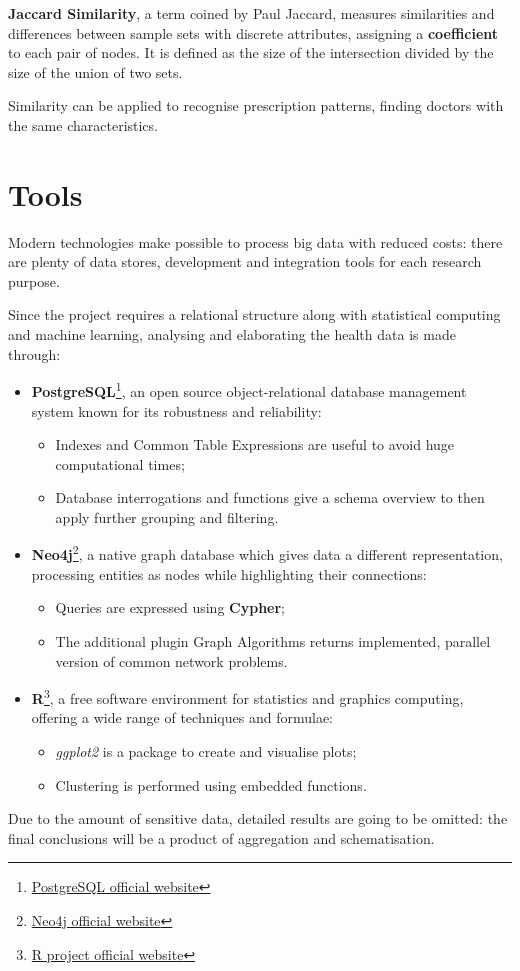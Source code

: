 \textbf{Jaccard Similarity}, a term coined by Paul Jaccard, measures similarities and differences between sample sets with discrete attributes, assigning a \textbf{coefficient} to each pair of nodes. It is defined as the size of the intersection divided by the size of the union of two sets. 

Similarity can be applied to recognise prescription patterns, finding doctors with the same characteristics.

\section{Tools}
Modern technologies make possible to process big data with reduced costs: there are plenty of data stores, development and integration tools for each research purpose. 

Since the project requires a relational structure along with statistical computing and machine learning, analysing and elaborating the health data is made through:
\begin{itemize}
	\item \textbf{PostgreSQL}\footnote{\href{https://www.postgresql.org/}{PostgreSQL official website}}, an open source object-relational database management system known for its robustness and reliability:
	\begin{itemize}
		\item Indexes and Common Table Expressions are useful to avoid huge computational times;
		\item Database interrogations and functions give a schema overview to then apply further grouping and filtering.
	\end{itemize}
	\item \textbf{Neo4j}\footnote{\href{https://neo4j.com/}{Neo4j official website}}, a native graph database which gives data a different representation, processing entities as nodes while highlighting their connections:
	\begin{itemize}
		\item Queries are expressed using \textbf{Cypher};
		\item The additional plugin Graph Algorithms returns implemented, parallel version of common network problems. 
	\end{itemize}
	\item \textbf{R}\footnote{\href{https://www.r-project.org/}{R project official website}}, a free software environment for statistics and graphics computing, offering a wide range of techniques and formulae:
	\begin{itemize}
		\item \textit{ggplot2} is a package to create and visualise plots;
		\item Clustering is performed using embedded functions.
	\end{itemize}
\end{itemize}

Due to the amount of sensitive data, detailed results are going to be omitted: the final conclusions will be a product of aggregation and schematisation.
